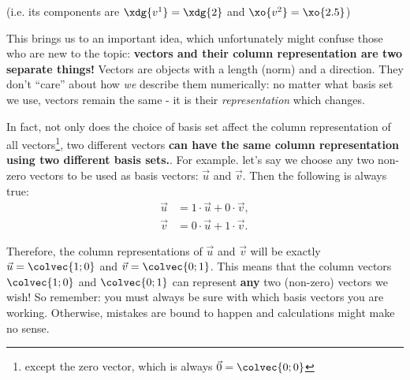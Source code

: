 \vspace{-1.2em}
\begin{center}
\end{center}
(i.e. its components are $\xdg{v^{1}}=\xdg{2}$ and $\xo{v^{2}}=\xo{2.5}$)

This brings us to an important idea, which unfortunately might confuse those who are new to the topic: \textbf{vectors and their column representation are two separate things!} Vectors are objects with a length (norm) and a direction. They don't ``care'' about how \textit{we} describe them numerically: no matter what basis set we use, vectors remain the same - it is their \textit{representation} which changes.

In fact, not only does the choice of basis set affect the column representation of all vectors\footnote{except the zero vector, which is always $\vec{0}=\colvec{0;0}$}, two different vectors \textbf{can have the same column representation using two different basis sets.}. For example. let's say we choose any two non-zero vectors to be used as basis vectors: $\vec{u}$ and $\vec{v}$. Then the following is always true:
\begin{align*}
  \vec{u} &= 1\cdot\vec{u} + 0\cdot\vec{v},\\
  \vec{v} &= 0\cdot\vec{u} + 1\cdot\vec{v}.
\end{align*}

Therefore, the column representations of $\vec{u}$ and $\vec{v}$ will be exactly $\vec{u}=\colvec{1;0}$ and $\vec{v}=\colvec{0;1}$. This means that the column vectors $\colvec{1;0}$ and $\colvec{0;1}$ can represent \textbf{any} two (non-zero) vectors we wish! So remember: you must always be sure with which basis vectors you are working. Otherwise, mistakes are bound to happen and calculations might make no sense.

